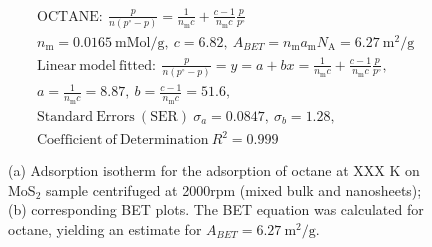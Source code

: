 

\begin{align*}
&\mathrm{OCTANE:}\ \frac{p}{n(p^\circ-p)}=\frac{1}{n_\mathrm{m}c}+\frac{c-1}{n_\mathrm{m}c}\frac{p}{p^\circ}\\
&{n_\mathrm{m}}=0.0165\ \mathrm{mMol/g},\ c=6.82,\ A_{BET}={n_\mathrm{m}}{a_\mathrm{m}}{N_\mathrm{A}}=6.27\ \mathrm{m}^2\mathrm{/g}\\
&\mathrm{Linear\ model\ fitted:}\ \frac{p}{n(p^\circ-p)}=y=a+bx=\frac{1}{n_\mathrm{m}c}+\frac{c-1}{n_\mathrm{m}c}\frac{p}{p^\circ},\\
&a=\frac{1}{n_\mathrm{m}c}=8.87,\ b=\frac{c-1}{n_\mathrm{m}c}=51.6,\\
&\mathrm{Standard\ Errors\ (SER)}\ \sigma_a=0.0847,\ \sigma_b=1.28,\\
&\mathrm{Coefficient\ of\ Determination}\ R^2 = 0.999
\end{align*}


\begin{figure}[htb]
\hfill
{}
\caption{(a) Adsorption isotherm for the adsorption of octane at XXX K on MoS$_2$ 
sample centrifuged at 2000rpm (mixed bulk and nanosheets);
(b) corresponding BET plots. The BET equation was calculated for octane, yielding an estimate for $A_{BET}=6.27\ \mathrm{m}^2\mathrm{/g}$.}

\label{fig:sa-Reference-As-Supplied-100mg-3mm-50C-S1-SE-10ml}
\end{figure}


